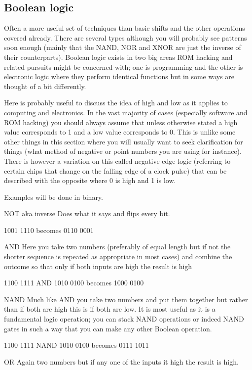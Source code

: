 \documentclass[
]{book}
\begin{document}
\hypertarget{boolean-logic}{%
\subsection{Boolean logic}\label{boolean-logic}}

Often a more useful set of techniques than basic shifts and the other operations covered already. There are several types although you will probably see patterns soon enough (mainly that the NAND, NOR and XNOR are just the inverse of their counterparts). Boolean logic exists in two big areas ROM hacking and related pursuits might be concerned with; one is programming and the other is electronic logic where they perform identical functions but in some ways are thought of a bit differently.

Here is probably useful to discuss the idea of high and low as it applies to computing and electronics. In the vast majority of cases (especially software and ROM hacking) you should always assume that unless otherwise stated a high value corresponds to 1 and a low value corresponds to 0. This is unlike some other things in this section where you will usually want to seek clarification for things (what method of negative or point numbers you are using for instance). There is however a variation on this called negative edge logic (referring to certain chips that change on the falling edge of a clock pulse) that can be described with the opposite where 0 is high and 1 is low.

Examples will be done in binary.

NOT aka inverse Does what it says and flips every bit.

1001 1110 becomes 0110 0001

AND Here you take two numbers (preferably of equal length but if not the shorter sequence is repeated as appropriate in most cases) and combine the outcome so that only if both inputs are high the result is high

1100 1111 AND 1010 0100 becomes 1000 0100

NAND Much like AND you take two numbers and put them together but rather than if both are high this is if both are low. It is most useful as it is a fundamental logic operation; you can stack NAND operations or indeed NAND gates in such a way that you can make any other Boolean operation.

1100 1111 NAND 1010 0100 becomes 0111 1011

OR Again two numbers but if any one of the inputs it high the result is high.
\end{document}
